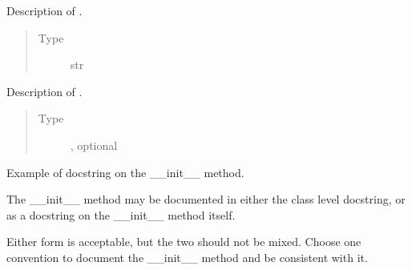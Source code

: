 \documentclass[letterpaper,10pt,english]{sphinxmanual}
\begin{document}
\begin{description}
\begin{fulllineitems}
\begin{fulllineitems}
\label{\detokenize{autogen:example_docstring.ExampleClass.attr1}}
Description of .
\begin{quote}\begin{description}
\item[{Type}] \leavevmode
str

\end{description}\end{quote}

\end{fulllineitems}


\begin{fulllineitems}
\label{\detokenize{autogen:example_docstring.ExampleClass.attr2}}
Description of .
\begin{quote}\begin{description}
\item[{Type}] \leavevmode
{}, optional

\end{description}\end{quote}

\end{fulllineitems}


\begin{fulllineitems}
\label{\detokenize{autogen:example_docstring.ExampleClass.__init__}}
Example of docstring on the \_\_init\_\_ method.

The \_\_init\_\_ method may be documented in either the class level
docstring, or as a docstring on the \_\_init\_\_ method itself.

Either form is acceptable, but the two should not be mixed. Choose one
convention to document the \_\_init\_\_ method and be consistent with it.


\end{fulllineitems}
\end{fulllineitems}
\end{description}
\end{document}
